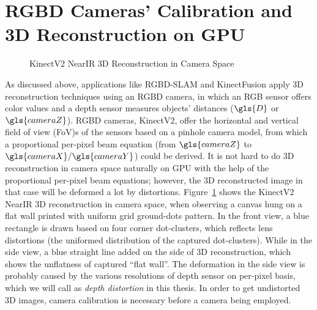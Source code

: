 \section{RGBD Cameras' Calibration and 3D Reconstruction on GPU}
\label{sectionRGBDcameraCalibration}
\indent
 \begin{figure}[b]
{}
\caption{\gls{KinectV2} \gls{NearIR} \gls{3D} Reconstruction in Camera Space}
\label{NearIR}
\end{figure}%
%
As discussed above, applications like \gls{RGBD}-\gls{SLAM} and KinectFusion apply \gls{3D} reconstruction techniques using an \gls{RGBD} camera, in which an RGB sensor offers color values and a depth sensor measures objects' distances (\(\gls{D}\) or \(\gls{cameraZ}\)). \gls{RGBD} cameras,  \gls{KinectV2}, offer the horizontal and vertical field of view (\gls{FoV})s of the sensors based on a pinhole camera model, from which a proportional per-pixel beam equation (from \(\gls{cameraZ}\) to \(\gls{cameraX}/\gls{cameraY}\)) could be derived. It is not hard to do \gls{3D} reconstruction in camera space naturally on \gls{GPU} with the help of the proportional per-pixel beam equations; however, the \gls{3D} reconstructed image in that case will be deformed a lot by distortions. Figure~\ref{NearIR} shows the \gls{KinectV2} \gls{NearIR} \gls{3D} reconstruction in camera space, when observing a canvas hung on a flat wall printed with uniform grid ground-dots pattern. In the front view, a blue rectangle is drawn based on four corner dot-clusters, which reflects lens distortions (the uniformed distribution of the captured dot-clusters). While in the side view, a blue straight line added on the side of \gls{3D} reconstruction, which shows the unflatness of captured \enquote{flat wall}. The deformation in the side view is probably caused by the various resolutions of depth sensor on per-pixel basis, which we will call as \emph{depth distortion} in this thesis. In order to get undistorted \gls{3D} images, camera calibration is necessary before a camera being employed.%
\\\indent%
